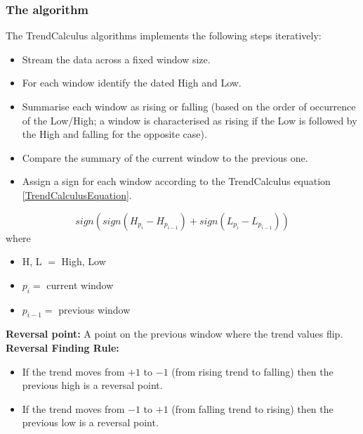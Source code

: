 \documentclass[a4, 11pt]{article}
\begin{document}
\subsubsection{The algorithm}
The TrendCalculus algorithms implements the following steps iteratively:
\begin{itemize}
    \item Stream the data across a fixed window size. 
    \item For each window identify the dated High and Low. 
    \item Summarise each window as rising or falling (based on the order of occurrence of the Low/High; a window is characterised as rising if the Low is followed by the High and falling for the opposite case).
    \item Compare the summary of the current window to the previous one. 
    \item Assign a sign for each window according to the TrendCalculus equation \ref{TrendCalculusEquation}. 
\end{itemize}
\begin{equation}\label{TrendCalculusEquation}
    sign(sign(H_{p_i}-H_{p_{i-1}})+sign(L_{p_i}-L_{p_{i-1}}))
\end{equation} where 
\begin{itemize}
    \item H, L $=$ High, Low 
    \item $p_i=$ current window
    \item $p_{i-1}=$ previous window
\end{itemize}
\textbf{Reversal point:} A point on the previous window where the trend values flip.\\[2ex]
\textbf{Reversal Finding Rule:}
\begin{itemize}
    \item If the trend moves from $+1$ to $-1$ (from rising trend to falling) then the previous high is a reversal point.
    \item If the trend moves from $-1$ to $+1$ (from falling trend to rising) then the previous low is a reversal point. 
\end{itemize}
\end{document}
